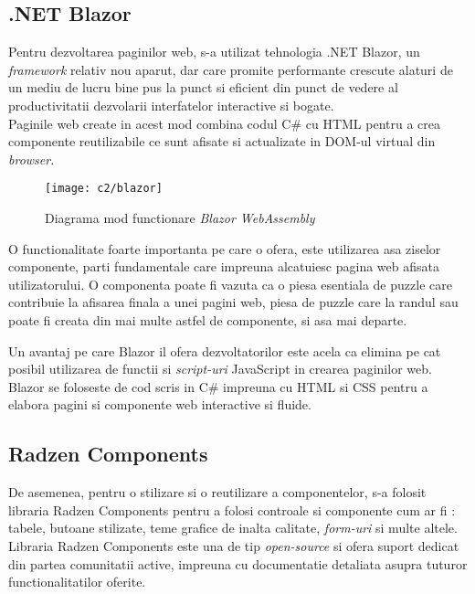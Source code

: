 \subsection*{.NET Blazor}
Pentru dezvoltarea paginilor web, s-a utilizat tehnologia .NET Blazor, un \textit{framework} relativ nou aparut, dar care promite performante crescute alaturi de un mediu de lucru bine pus la punct si eficient din punct de vedere al productivitatii dezvolarii interfatelor interactive si bogate.\\
Paginile web create in acest mod combina codul C\# cu HTML pentru a crea componente reutilizabile ce sunt  afisate si actualizate in DOM-ul virtual din \textit{browser}.\\

\vspace{1cm}
\begin{figure}[h]
	\centering
	
	\texttt{[image: c2/blazor]}
	\caption{Diagrama mod functionare \textit{Blazor WebAssembly}}
\end{figure}

O functionalitate foarte importanta pe care o ofera, este utilizarea asa ziselor componente, parti fundamentale care impreuna alcatuiesc pagina web afisata utilizatorului. O componenta poate fi vazuta ca o piesa esentiala de puzzle care contribuie la afisarea finala a unei pagini web, piesa de puzzle care la randul sau poate fi creata din mai multe astfel de componente, si asa mai departe.

Un avantaj pe care Blazor il ofera dezvoltatorilor este acela ca elimina pe cat posibil utilizarea de functii si \textit{script-uri }JavaScript in crearea paginilor web. Blazor se foloseste de cod scris in C\# impreuna cu HTML si CSS pentru a elabora pagini si componente web interactive si fluide.\\

\subsection*{Radzen Components}
De asemenea, pentru o stilizare si o reutilizare a componentelor, s-a folosit libraria Radzen Components pentru a folosi controale si componente cum ar fi : tabele, butoane stilizate, teme grafice de inalta calitate, \textit{form-uri} si multe altele.\\
 Libraria Radzen Components este una de tip \textit{open-source} si ofera suport dedicat din partea comunitatii active, impreuna cu documentatie detaliata asupra tuturor functionalitatilor oferite.


